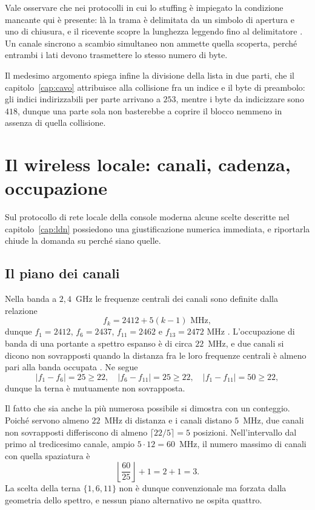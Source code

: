 Vale osservare che nei protocolli in cui lo stuffing è impiegato la condizione mancante qui è presente: là la trama è delimitata da un simbolo di apertura e uno di chiusura, e il ricevente scopre la lunghezza leggendo fino al delimitatore \cite{rfc1662}. Un canale sincrono a scambio simultaneo non ammette quella scoperta, perché entrambi i lati devono trasmettere lo stesso numero di byte.

Il medesimo argomento spiega infine la divisione della lista in due parti, che il capitolo~\ref{cap:cavo} attribuisce alla collisione fra un indice e il byte di preambolo: gli indici indirizzabili per parte arrivano a $253$, mentre i byte da indicizzare sono $418$, dunque una parte sola non basterebbe a coprire il blocco nemmeno in assenza di quella collisione.

\section{Il wireless locale: canali, cadenza, occupazione}

Sul protocollo di rete locale della console moderna alcune scelte descritte nel capitolo~\ref{cap:ldn} possiedono una giustificazione numerica immediata, e riportarla chiude la domanda su perché siano quelle.

\subsection{Il piano dei canali}

Nella banda a $2{,}4$~GHz le frequenze centrali dei canali sono definite dalla relazione
\[
f_k = 2412 + 5(k-1) \text{ MHz},
\]
dunque $f_1 = 2412$, $f_6 = 2437$, $f_{11} = 2462$ e $f_{13} = 2472$ MHz \cite{ieee80211}. L'occupazione di banda di una portante a spettro espanso è di circa $22$~MHz, e due canali si dicono non sovrapposti quando la distanza fra le loro frequenze centrali è almeno pari alla banda occupata \cite{proakis}. Ne segue
\[
|f_1 - f_6| = 25 \ge 22, \quad |f_6 - f_{11}| = 25 \ge 22, \quad |f_1 - f_{11}| = 50 \ge 22,
\]
dunque la terna è mutuamente non sovrapposta.

Il fatto che sia anche la più numerosa possibile si dimostra con un conteggio. Poiché servono almeno $22$~MHz di distanza e i canali distano $5$~MHz, due canali non sovrapposti differiscono di almeno $\lceil 22/5 \rceil = 5$ posizioni. Nell'intervallo dal primo al tredicesimo canale, ampio $5 \cdot 12 = 60$~MHz, il numero massimo di canali con quella spaziatura è
\[
\left\lfloor \frac{60}{25} \right\rfloor + 1 = 2 + 1 = 3.
\]
La scelta della terna $\{1, 6, 11\}$ non è dunque convenzionale ma forzata dalla geometria dello spettro, e nessun piano alternativo ne ospita quattro.

